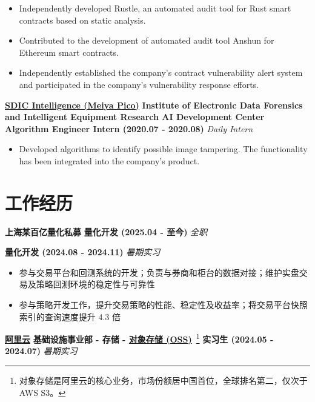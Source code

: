     \begin{itemize}
        \item Independently developed Rustle, an automated audit tool for Rust smart contracts based on static analysis.
        \item Contributed to the development of automated audit tool Anshun for Ethereum smart contracts.
        \item Independently established the company's contract vulnerability alert system and participated in the company's vulnerability response efforts.
    \end{itemize}

    \noindent \textbf{\href{https://300188.cn}{SDIC Intelligence (Meiya Pico)}} \textbar{} \textbf{Institute of Electronic Data Forensics and Intelligent Equipment Research AI Development Center} \textbar{} \textbf{Algorithm Engineer Intern (2020.07 - 2020.08)} \hfill \textsl{Daily Intern}

    \begin{itemize}
        \item Developed algorithms to identify possible image tampering. The functionality has been integrated into the company's product.
    \end{itemize}

\else

    \section*{工作经历}

    \noindent \textbf{上海某百亿量化私募} \textbar{} \textbf{量化开发 (2025.04 - 至今)} \hfill \textsl{全职}

    \noindent \textbf{\phantom{上海某百亿量化私募}} \textbar{} \textbf{量化开发 (2024.08 - 2024.11)} \hfill \textsl{暑期实习}

    \begin{itemize}
        \item 参与交易平台和回测系统的开发；负责与券商和柜台的数据对接；维护实盘交易及策略回测环境的稳定性与可靠性
        \item 参与策略开发工作，提升交易策略的性能、稳定性及收益率；将交易平台快照索引的查询速度提升 4.3 倍
    \end{itemize}

    \noindent \textbf{\href{https://www.aliyun.com}{阿里云}} \textbar{} \textbf{基础设施事业部 - 存储 - \href{https://www.aliyun.com/product/oss}{对象存储 (OSS)}}~\footnote{对象存储是阿里云的核心业务，市场份额居中国首位，全球排名第二，仅次于 AWS S3。} \textbar{} \textbf{实习生 (2024.05 - 2024.07)} \hfill \textsl{暑期实习}


